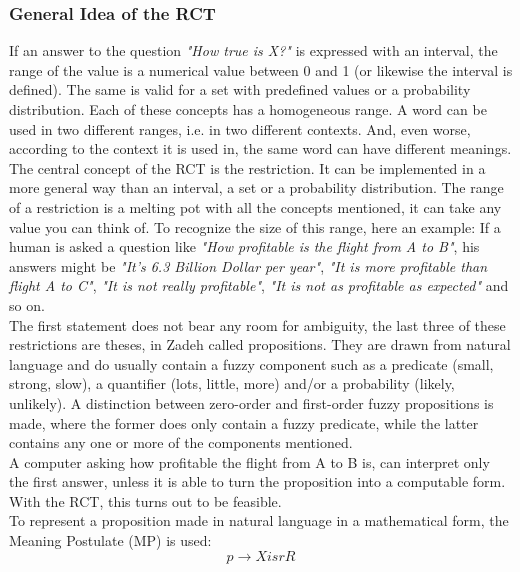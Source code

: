 \documentclass[conference]{IEEEtran}
\begin{document}
\subsubsection{General Idea of the RCT}
If an answer to the question \emph{"How true is X?"} is expressed with an interval, the range of the value is a numerical value between 0 and 1 (or likewise the interval is defined). The same is valid for a set with predefined values or a probability distribution. Each of these concepts has a homogeneous range. A word can be used in two different ranges, i.e. in two different contexts. And, even worse, according to the context it is used in, the same word can have different meanings.\\
The central concept of the RCT is the restriction. It can be implemented in a more general way than an interval, a set or a probability distribution. The range of a restriction is a melting pot with all the concepts mentioned, it can take any value you can think of. To recognize the size of this range, here an example: If a human is asked a question like \emph{"How profitable is the flight from A to B"}, his answers might be \emph{"It's 6.3 Billion Dollar per year"}, \emph{"It is more profitable than flight A to C"}, \emph{"It is not really profitable"}, \emph{"It is not as profitable as expected"} and so on.\\
The first statement does not bear any room for ambiguity, the last three of these restrictions are theses, in Zadeh \cite{zadeh2013} called propositions. They are drawn from natural language and do usually contain a fuzzy component such as a predicate (small, strong, slow), a quantifier (lots, little, more) and/or a probability (likely, unlikely). A distinction between zero-order and first-order fuzzy propositions is made, where the former does only contain a fuzzy predicate, while the latter contains any one or more of the components mentioned.\\
A computer asking how profitable the flight from A to B is, can interpret only the first answer, unless it is able to turn the proposition into a computable form. With the RCT, this turns out to be feasible.\\
To represent a proposition made in natural language in a mathematical form, the Meaning Postulate (MP) is used:
\begin{equation} \label{eq:mp}
p \rightarrow X isr R
\end{equation}
\end{document}
